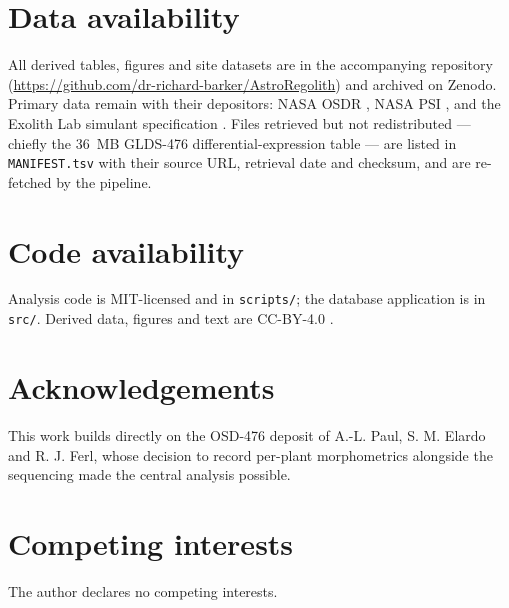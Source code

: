 \documentclass[11pt,a4paper]{article}
\begin{document}
\section*{Data availability}
All derived tables, figures and site datasets are in the accompanying repository
(\url{https://github.com/dr-richard-barker/AstroRegolith}) and archived on Zenodo.
Primary data remain with their depositors: NASA OSDR \citep{osdr476,osdr670}, NASA PSI
\citep{nasapsi}, and the Exolith Lab simulant specification \citep{exolithlhs1}. Files
retrieved but not redistributed --- chiefly the 36~MB GLDS-476 differential-expression
table --- are listed in \texttt{MANIFEST.tsv} with their source URL, retrieval date and
checksum, and are re-fetched by the pipeline.

\section*{Code availability}
Analysis code is MIT-licensed and in \texttt{scripts/}; the database application is in
\texttt{src/}. Derived data, figures and text are CC-BY-4.0 \citep{astroregolith}.

\section*{Acknowledgements}
This work builds directly on the OSD-476 deposit of A.-L. Paul, S. M. Elardo and
R. J. Ferl, whose decision to record per-plant morphometrics alongside the sequencing
made the central analysis possible.

\section*{Competing interests}
The author declares no competing interests.



\end{document}
